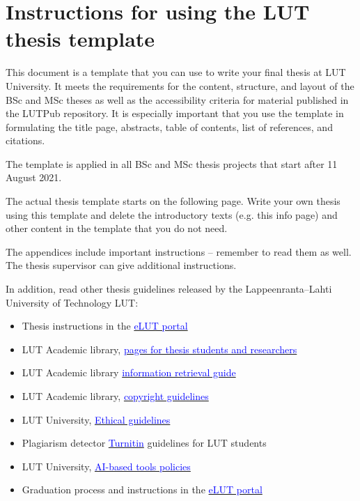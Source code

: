 \section*{Instructions for using the LUT thesis template}

{\color{red}This document is a template that you can use to write your final thesis at LUT University. It meets the requirements for the content, structure, and layout of the BSc and MSc theses as well as the accessibility criteria for material published in the LUTPub repository. It is especially important that you use the template in formulating the title page, abstracts, table of contents, list of references, and citations.

The template is applied in all BSc and MSc thesis projects that start after 11 August 2021.

The actual thesis template starts on the following page. Write your own thesis using this template and delete the introductory texts (e.g. this info page) and other content in the template that you do not need.

The appendices include important instructions – remember to read them as well. The thesis supervisor can give additional instructions.

In addition, read other thesis guidelines released by the Lappeenranta–Lahti University of Technology LUT: 
\begin{itemize}
    \item Thesis instructions in the \href{https://elut.lut.fi/en/completing-studies/theses}{\textcolor{blue}{eLUT portal}}
    \item LUT Academic library, \href{https://www.lut.fi/en/about-us/lut-academic-library/theses-and-dissertations}{\textcolor{blue}{pages for thesis students and researchers}} 
    \item LUT Academic library \href{https://libguides.lut.fi/informationliteracy}{\textcolor{blue}{information retrieval guide}}
    \item LUT Academic library, \href{https://libguides.lut.fi/copyright/}{\textcolor{blue}{copyright guidelines}} 
    \item LUT University, \href{https://elut.lut.fi/en/completing-studies/rules-and-regulations/ethical-guidelines-and-guidelines-handling-misconduct}{\textcolor{blue}{Ethical guidelines}} 
    \item Plagiarism detector \href{https://elut.lut.fi/en/it-instructions-study-tools/turnitin}{\textcolor{blue}{Turnitin}} guidelines for LUT students
    \item LUT University, \href{https://elut.lut.fi/en/completing-studies/rules-and-regulations/ai-based-tools-policies}{\textcolor{blue}{AI-based tools policies}}
    \item Graduation process and instructions in the \href{https://elut.lut.fi/en/graduation}{\textcolor{blue}{eLUT portal}}
\end{itemize}
}

\clearpage  %

